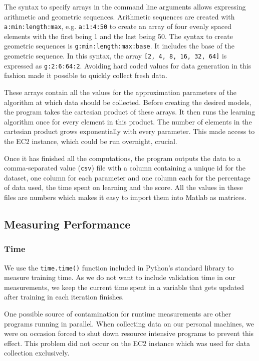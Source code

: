 \documentclass[a4paper,12pt,twoside,openright]{report}
\begin{document}
The syntax to specify arrays in the command line arguments allows expressing arithmetic and geometric sequences. Arithmetic sequences are created with \texttt{a:min:length:max}, e.g. \texttt{a:1:4:50} to create an array of four evenly spaced elements with the first being 1 and the last being 50. The syntax to create geometric sequences is \texttt{g:min:length:max:base}. It includes the base of the geometric sequence. In this syntax, the array \texttt{[2, 4, 8, 16, 32, 64]} is expressed as \texttt{g:2:6:64:2}. Avoiding hard coded values for data generation in this fashion made it possible to quickly collect fresh data.
	
These arrays contain all the values for the approximation parameters of the algorithm at which data should be collected. Before creating the desired models, the program takes the cartesian product of these arrays. It then runs the learning algorithm once for every element in this product. The number of elements in the cartesian product grows exponentially with every parameter. This made access to the EC2 instance, which could be run overnight, crucial.

Once it has finished all the computations, the program outputs the data to a comma-separated value (\texttt{csv}) file with a column containing a unique id for the dataset, one column for each parameter and one column each for the percentage of data used, the time spent on learning and the score. All the values in these files are numbers which makes it easy to import them into Matlab as matrices. 



\subsection{Measuring Performance}

\subsubsection{Time}
We use the \texttt{time.time()} function included in Python's standard library to measure training time. As we do not want to include validation time in our measurements, we keep the current time spent in a variable that gets updated after training in each iteration finishes.

One possible source of contamination for runtime measurements are other programs running in parallel. When collecting data on our personal machines, we were on occasion forced to shut down resource intensive programs to prevent this effect. This problem did not occur on the EC2 instance which was used for data collection exclusively.
\end{document}
